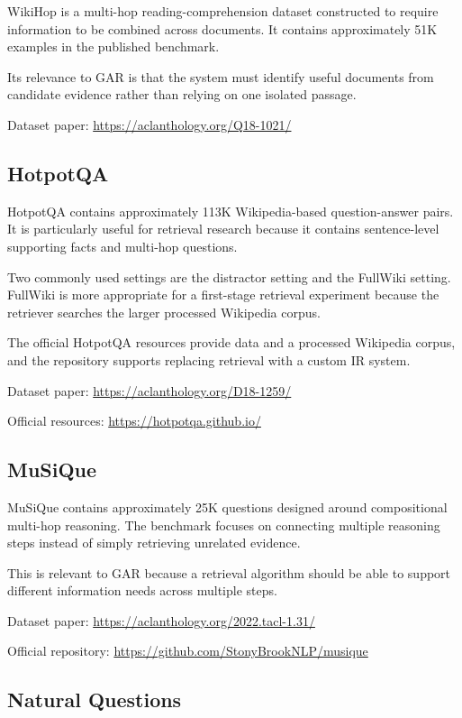 \documentclass[11pt,a4paper]{article}
\begin{document}
WikiHop is a multi-hop reading-comprehension dataset constructed to require information to be combined across documents. It contains approximately 51K examples in the published benchmark.

Its relevance to GAR is that the system must identify useful documents from candidate evidence rather than relying on one isolated passage.

Dataset paper:
\url{https://aclanthology.org/Q18-1021/}

\subsection{HotpotQA}

HotpotQA contains approximately 113K Wikipedia-based question-answer pairs. It is particularly useful for retrieval research because it contains sentence-level supporting facts and multi-hop questions.

Two commonly used settings are the distractor setting and the FullWiki setting. FullWiki is more appropriate for a first-stage retrieval experiment because the retriever searches the larger processed Wikipedia corpus.

The official HotpotQA resources provide data and a processed Wikipedia corpus, and the repository supports replacing retrieval with a custom IR system.

Dataset paper:
\url{https://aclanthology.org/D18-1259/}

Official resources:
\url{https://hotpotqa.github.io/}

\subsection{MuSiQue}

MuSiQue contains approximately 25K questions designed around compositional multi-hop reasoning. The benchmark focuses on connecting multiple reasoning steps instead of simply retrieving unrelated evidence.

This is relevant to GAR because a retrieval algorithm should be able to support different information needs across multiple steps.

Dataset paper:
\url{https://aclanthology.org/2022.tacl-1.31/}

Official repository:
\url{https://github.com/StonyBrookNLP/musique}

\subsection{Natural Questions}
\end{document}
